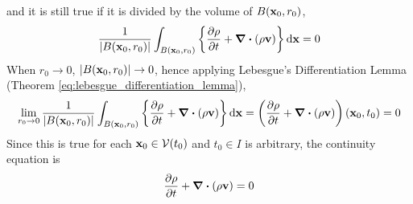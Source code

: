 and it is still true if it is divided by the volume of $B(\vb{x}_0, r_0)$,
\begin{equation}
	\frac{1}{\abs{B(\vb{x}_0, r_0)}}
	\int_{B(\vb{x}_0, r_0)} \left\{ \frac{\partial \rho}{\partial t} + \div(\rho \vb{v}) \right\} \dd{\vb{x}} = 0
\end{equation}
When $r_0 \to 0$, $\abs{B(\vb{x}_0, r_0)} \to 0$, hence applying Lebesgue's Differentiation Lemma (Theorem \ref{eq:lebesgue_differentiation_lemma}),
\begin{equation}
	\lim_{r_0 \to 0}
	\frac{1}{\abs{B(\vb{x}_0, r_0)}}
	\int_{B(\vb{x}_0, r_0)} \left\{ \frac{\partial \rho}{\partial t} + \div(\rho \vb{v}) \right\} \dd{\vb{x}} = 
	\left( \frac{\partial \rho}{\partial t} + \div(\rho \vb{v}) \right) (\vb{x}_0, t_0) = 0
\end{equation}
Since this is true for each $\vb{x}_0 \in \mathcal{V}(t_0)$ and $t_0 \in I$ is arbitrary, the continuity equation is
\begin{equation}
	\pdv{\rho}{t} + \div(\rho \vb{v}) = 0
\end{equation}

